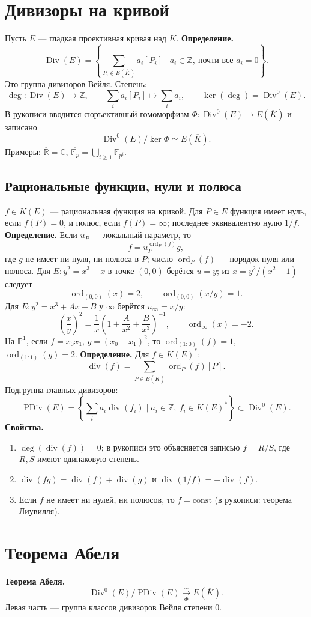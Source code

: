 \documentclass[12pt,a4paper]{article}
\newcommand{\Z}{\mathbb Z}\newcommand{\F}{\mathbb F}\newcommand{\Kbar}{\overline K}
\newcommand{\Div}{\operatorname{Div}}\newcommand{\PDiv}{\operatorname{PDiv}}\newcommand{\ord}{\operatorname{ord}}\newcommand{\Supp}{\operatorname{Supp}}
\begin{document}
\section{Дивизоры на кривой}
Пусть $E$ --- гладкая проективная кривая над $K$.
\textbf{Определение.}
\[\Div(E)=\left\{\sum_{P_i\in E(\Kbar)}a_i[P_i]\mid a_i\in\Z,\ \text{почти все }a_i=0\right\}.\]
Это группа дивизоров Вейля. Степень:
\[\deg:\Div(E)\to\Z,\qquad \sum_i a_i[P_i]\mapsto\sum_i a_i,\qquad \ker(\deg)=\Div^0(E).\]
В рукописи вводится сюръективный гомоморфизм $\Phi:\Div^0(E)\to E(\Kbar)$ и записано
\[\Div^0(E)/\ker\Phi\simeq E(\Kbar).\]
Примеры: $\overline{\mathbb R}=\mathbb C$, $\overline{\F_p}=\bigcup_{i\ge1}\F_{p^i}$.
\subsection*{Рациональные функции, нули и полюса}
$f\in K(E)$ --- рациональная функция на кривой. Для $P\in E$ функция имеет нуль, если $f(P)=0$, и полюс, если $f(P)=\infty$; последнее эквивалентно нулю $1/f$.
\textbf{Определение.} Если $u_P$ --- локальный параметр, то
\[f=u_P^{\ord_P(f)}g,\]
где $g$ не имеет ни нуля, ни полюса в $P$; число $\ord_P(f)$ --- порядок нуля или полюса.
Для $E:y^2=x^3-x$ в точке $(0,0)$ берётся $u=y$; из $x=y^2/(x^2-1)$ следует
\[\ord_{(0,0)}(x)=2,\qquad \ord_{(0,0)}(x/y)=1.\]
Для $E:y^2=x^3+Ax+B$ у $\infty$ берётся $u_\infty=x/y$:
\[\left(\frac xy\right)^2=\frac1x\left(1+\frac A{x^2}+\frac B{x^3}\right)^{-1},\qquad \ord_\infty(x)=-2.\]
На $\mathbb P^1$, если $f=x_0x_1$, $g=(x_0-x_1)^2$, то $\ord_{(1:0)}(f)=1$, $\ord_{(1:1)}(g)=2$.
\textbf{Определение.} Для $f\in\Kbar(E)^*$:
\[\operatorname{div}(f)=\sum_{P\in E(\Kbar)}\ord_P(f)[P].\]
Подгруппа главных дивизоров:
\[\PDiv(E)=\left\{\sum_i a_i\operatorname{div}(f_i)\mid a_i\in\Z,\ f_i\in\Kbar(E)^*\right\}\subset\Div^0(E).\]
\textbf{Свойства.}
\begin{enumerate}[label=\arabic*)]
\item $\deg(\operatorname{div}(f))=0$; в рукописи это объясняется записью $f=R/S$, где $R,S$ имеют одинаковую степень.
\item $\operatorname{div}(fg)=\operatorname{div}(f)+\operatorname{div}(g)$ и $\operatorname{div}(1/f)=-\operatorname{div}(f)$.
\item Если $f$ не имеет ни нулей, ни полюсов, то $f=\mathrm{const}$ (в рукописи: теорема Лиувилля).
\end{enumerate}
\section{Теорема Абеля}
\textbf{Теорема Абеля.}
\[\Div^0(E)/\PDiv(E)\xrightarrow[\Phi]{\sim}E(\Kbar).\]
Левая часть --- группа классов дивизоров Вейля степени $0$.
\end{document}
